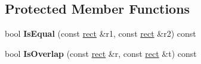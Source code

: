\subsection*{Protected Member Functions}
\begin{DoxyCompactItemize}
\item 
\hypertarget{classImageDetector_ab8ae540f23e94c8acdb0cc0893bffe6d}{}bool {\bfseries Is\+Equal} (const \hyperlink{structrect}{rect} \&r1, const \hyperlink{structrect}{rect} \&r2) const \label{classImageDetector_ab8ae540f23e94c8acdb0cc0893bffe6d}

\item 
\hypertarget{classImageDetector_a52d903953d90efcde6e727910254f77d}{}bool {\bfseries Is\+Overlap} (const \hyperlink{structrect}{rect} \&r, const \hyperlink{structrect}{rect} \&t) const \label{classImageDetector_a52d903953d90efcde6e727910254f77d}

\end{DoxyCompactItemize}
